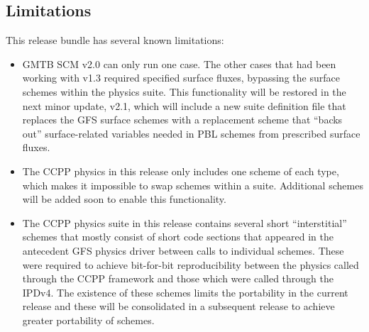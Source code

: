 \subsection{Limitations}

This release bundle has several known limitations:

\begin{itemize}
\item GMTB SCM v2.0 can only run one case. The other cases that had been working with v1.3 required specified surface fluxes, bypassing the surface schemes within the physics suite. This functionality will be restored in the next minor update, v2.1, which will include a new suite definition file that replaces the GFS surface schemes with a replacement scheme that ``backs out'' surface-related variables needed in PBL schemes from prescribed surface fluxes.
\item The CCPP physics in this release only includes one scheme of each type, which makes it impossible to swap schemes within a suite. Additional schemes will be added soon to enable this functionality.
\item The CCPP physics suite in this release contains several short ``interstitial'' schemes that mostly consist of short code sections that appeared in the antecedent GFS physics driver between calls to individual schemes. These were required to achieve bit-for-bit reproducibility between the physics called through the CCPP framework and those which were called through the IPDv4. The existence of these schemes limits the portability in the current release and these will be consolidated in a subsequent release to achieve greater portability of schemes.
\end{itemize}
